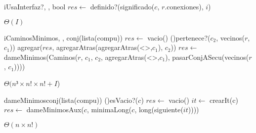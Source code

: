 \begin{Algoritmos}

  \begin{algoritmo}{iUsaInterfaz?}{, , }{bool}{}
    $res \gets$ definido?(significado($c$, $r$.conexiones), $i$) 
  \end{algoritmo} \datosAlgoritmo{} %
  {} %
  {} %
  {$\Theta(I)$} %
  {} %
   
  \begin{algoritmo}{iCaminosMinimos}{, , }{conj(lista(compu))}{}
    $res \gets$ vacio()
    \eIf(){pertenece?($c_{2}$, vecinos($r$, $c_{1}$))}{
      agregar($res$, agregarAtras(agregarAtras(<>,$c_{1}$), $c_{2}$))
    }{
      $res \gets$ dameMinimos(Caminos($r$, $c_{1}$, $c_{2}$, agregarAtras(<>,$c_{1}$), pasarConjASecu(vecinos($r$, $c_{1}$))))
    }
  \end{algoritmo}
  \datosAlgoritmo{} %
  {} %
  {} %
  {$\Theta(n³ \times n! \times n! + I$)} %
  {} %

  \begin{algoritmo}{dameMinimos}{}{conj(lista(compu))}
    \eIf(){esVacio?($c$)}{
      $res \gets$ vacio()
    }{
       $it \gets$ crearIt(c)
      $res \gets$ dameMinimosAux($c$, minimaLong($c$, long(siguiente($it$))))
    }
  \end{algoritmo}
  {} %
  {} %
  {$\Theta(n \times n!)$} %
  {} %


\end{Algoritmos}
